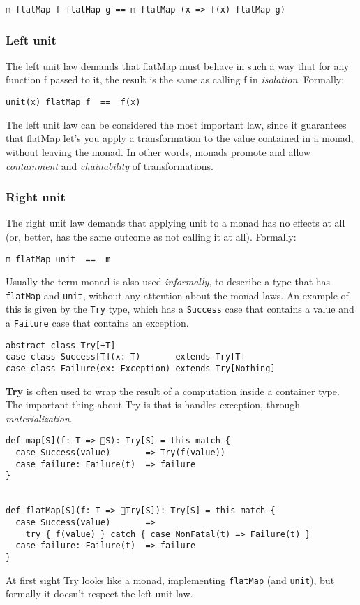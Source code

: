 \begin{verbatim}
m flatMap f flatMap g == m flatMap (x => f(x) flatMap g)
\end{verbatim}

\subsubsection{Left unit}\label{left-unit}

The left unit law demands that flatMap must behave in such a way that
for any function f passed to it, the result is the same as calling f in
\emph{isolation}. Formally:

\begin{verbatim}
unit(x) flatMap f  ==  f(x)
\end{verbatim}

The left unit law can be considered the most important law, since it
guarantees that flatMap let's you apply a transformation to the value
contained in a monad, without leaving the monad. In other words, monads
promote and allow \emph{containment} and \emph{chainability} of
transformations.

\subsubsection{Right unit}\label{right-unit}

The right unit law demands that applying unit to a monad has no effects
at all (or, better, has the same outcome as not calling it at all).
Formally:

\begin{verbatim}
m flatMap unit  ==  m
\end{verbatim}

Usually the term monad is also used \emph{informally}, to describe a
type that has \texttt{flatMap} and \texttt{unit}, without any attention
about the monad laws. An example of this is given by the \texttt{Try}
type, which has a \texttt{Success} case that contains a value and a
\texttt{Failure} case that contains an exception.

\begin{verbatim}
abstract class Try[+T]
case class Success[T](x: T)       extends Try[T]
case class Failure(ex: Exception) extends Try[Nothing]
\end{verbatim}

\textbf{Try} is often used to wrap the result of a computation inside a
container type. The important thing about Try is that is handles
exception, through \emph{materialization}.

\begin{verbatim}
def map[S](f: T => 􏰀S): Try[S] = this match {
  case Success(value)       => Try(f(value))
  case failure: Failure(t)  => failure
}


def flatMap[S](f: T => 􏰀Try[S]): Try[S] = this match {
  case Success(value)       =>
    try { f(value) } catch { case NonFatal(t) => Failure(t) }
  case failure: Failure(t)  => failure
}
\end{verbatim}

At first sight Try looks like a monad, implementing \texttt{flatMap}
(and \texttt{unit}), but formally it doesn't respect the left unit law.


